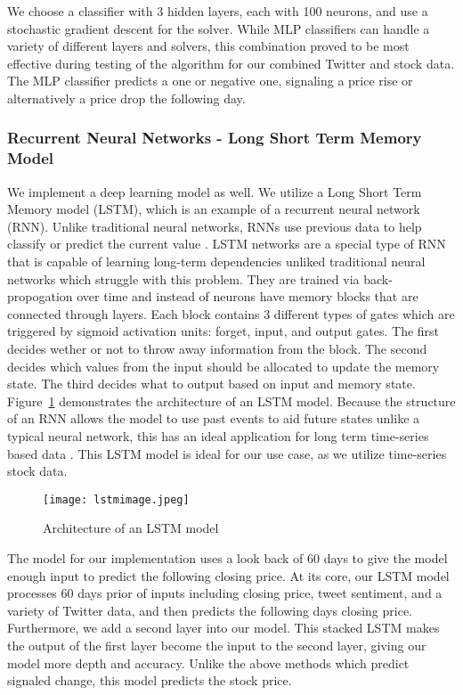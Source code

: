 \documentclass[../thesis.tex]{subfiles}
\begin{document}
We choose a classifier with 3 hidden layers, each with 100 neurons, and use a stochastic gradient descent for the solver. While MLP classifiers can handle a variety of different layers and solvers, this combination proved to be most effective during testing of the algorithm for our combined Twitter and stock data. The MLP classifier predicts a one or negative one, signaling a price rise or alternatively a price drop the following day. 


\subsubsection{Recurrent Neural Networks - Long Short Term Memory Model}
We implement a deep learning model as well. We utilize a Long Short Term Memory model (LSTM), which is an example of a recurrent neural network (RNN). Unlike traditional neural networks, RNNs use previous data to help classify or predict the current value \cite{Colah2015}. LSTM networks are a special type of RNN that is capable of learning long-term dependencies unliked traditional neural networks which struggle with this problem. They are trained via back-propogation over time and instead of neurons have memory blocks that are connected through layers. Each block contains 3 different types of gates which are triggered by sigmoid activation units: forget, input, and output gates. The first decides wether or not to throw away information from the block. The second decides which values from the input should be allocated to update the memory state. The third decides what to output based on input and memory state. Figure~\ref{lstmfig} demonstrates the architecture of an LSTM model. Because the structure of an RNN allows the model to use past events to aid future states unlike a typical neural network, this has an ideal application for long term time-series based data \cite{Colah2015}. This LSTM model is ideal for our use case, as we utilize time-series stock data. 

\begin{figure}[h]
\centering
\texttt{[image: lstmimage.jpeg]}
\caption{Architecture of an LSTM model \label{overflow}}
\label{lstmfig}
\end{figure}

The model for our implementation uses a look back of 60 days to give the model enough input to predict the following closing price. At its core, our LSTM model processes 60 days prior of inputs including closing price, tweet sentiment, and a variety of Twitter data, and then predicts the following days closing price. Furthermore, we add a second layer into our model. This stacked LSTM makes the output of the first layer become the input to the second layer, giving our model more depth and accuracy. Unlike the above methods which predict signaled change, this model predicts the stock price.
\end{document}
